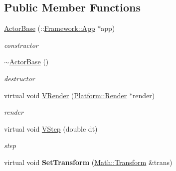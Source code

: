 \subsection*{Public Member Functions}
\begin{DoxyCompactItemize}
\item 
\hypertarget{classContent_1_1Actor_1_1ActorBase_a5dc48efa2df4c91455f402b959275021}{
\hyperlink{classContent_1_1Actor_1_1ActorBase_a5dc48efa2df4c91455f402b959275021}{ActorBase} (::\hyperlink{classFramework_1_1App}{Framework::App} $\ast$app)}
\label{classContent_1_1Actor_1_1ActorBase_a5dc48efa2df4c91455f402b959275021}

\begin{DoxyCompactList}\small\item\em constructor \item\end{DoxyCompactList}\item 
\hypertarget{classContent_1_1Actor_1_1ActorBase_ae4a0883fb2a5988680dfea1295d50064}{
\hyperlink{classContent_1_1Actor_1_1ActorBase_ae4a0883fb2a5988680dfea1295d50064}{$\sim$ActorBase} ()}
\label{classContent_1_1Actor_1_1ActorBase_ae4a0883fb2a5988680dfea1295d50064}

\begin{DoxyCompactList}\small\item\em destructor \item\end{DoxyCompactList}\item 
\hypertarget{classContent_1_1Actor_1_1ActorBase_ac405f5c4f8d4b384400333ef55c0591d}{
virtual void \hyperlink{classContent_1_1Actor_1_1ActorBase_ac405f5c4f8d4b384400333ef55c0591d}{VRender} (\hyperlink{classPlatform_1_1Render}{Platform::Render} $\ast$render)}
\label{classContent_1_1Actor_1_1ActorBase_ac405f5c4f8d4b384400333ef55c0591d}

\begin{DoxyCompactList}\small\item\em render \item\end{DoxyCompactList}\item 
\hypertarget{classContent_1_1Actor_1_1ActorBase_a378b1517f3199ff215c62064dd69cc3e}{
virtual void \hyperlink{classContent_1_1Actor_1_1ActorBase_a378b1517f3199ff215c62064dd69cc3e}{VStep} (double dt)}
\label{classContent_1_1Actor_1_1ActorBase_a378b1517f3199ff215c62064dd69cc3e}

\begin{DoxyCompactList}\small\item\em step \item\end{DoxyCompactList}\item 
\hypertarget{classContent_1_1Actor_1_1ActorBase_a55752457ae32841d53737b3eeca67680}{
virtual void {\bfseries SetTransform} (\hyperlink{classMath_1_1Transform}{Math::Transform} \&trans)}
\label{classContent_1_1Actor_1_1ActorBase_a55752457ae32841d53737b3eeca67680}


\end{DoxyCompactItemize}

